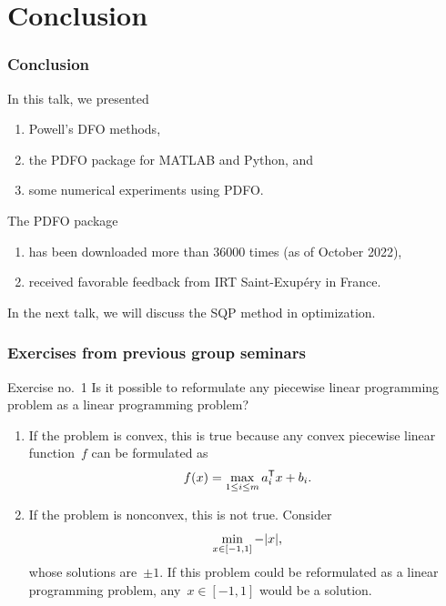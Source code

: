 \documentclass{polyu-presentation}
\newcommand{\obj}{f}
\begin{document}
\section{Conclusion}

\begin{frame}
    \frametitle{Conclusion}
    
    In this talk, we presented
    \begin{enumerate}
        \item \alert{Powell's DFO methods},
        \item the \alert{PDFO} package for MATLAB and Python, and
        \item some \alert{numerical experiments} using PDFO.
    \end{enumerate}

    \bigskip

    The PDFO package
    \begin{enumerate}
        \item has been \alert{downloaded} more than \num{36000} times (as of October 2022),
        \item received \alert{favorable feedback} from IRT Saint-Exup{\'{e}}ry in France.
    \end{enumerate}

    \bigskip

    In the next talk, we will discuss the \alert{SQP method} in optimization.
\end{frame}

\appendix

\begin{frame}
    \frametitle{Exercises from previous group seminars}

    \begin{block}{Exercise no.\ 1}
        Is it possible to \alert{reformulate} any \alert{piecewise linear programming} problem as a \alert{linear programming} problem?
    \end{block}

    \smallskip

    \begin{enumerate}
        \item If the problem is \alert{convex}, this is \alert{true} because any convex piecewise linear function~$\obj$ can be formulated as
        \begin{equation*}
            \obj(x) = \max_{1 \le i \le m} a_i^{\T} x + b_i.
        \end{equation*}
        \item If the problem is \alert{nonconvex}, this is \alert{not true}.
        Consider
        \begin{equation*}
            \min_{x \in [-1, 1]} -\lvert x\rvert,
        \end{equation*}
        whose solutions are~$\pm 1$.
        If this problem could be reformulated as a linear programming problem, any~$x \in [-1, 1]$ would be a solution.
    \end{enumerate}
\end{frame}
\end{document}
